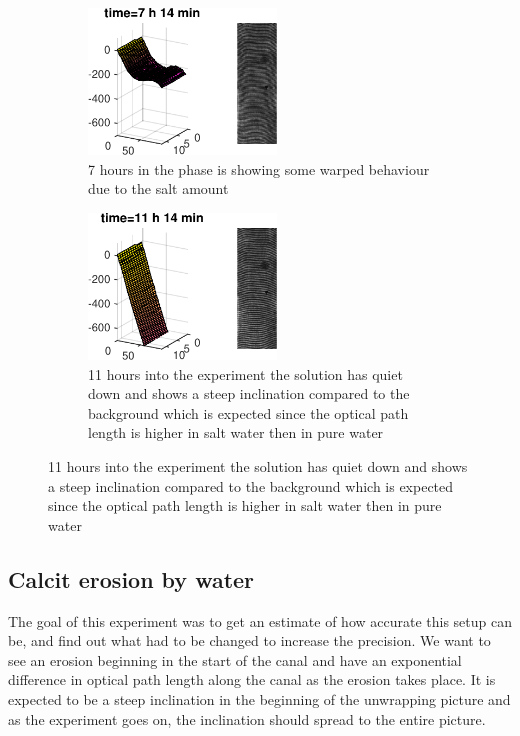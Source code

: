 \begin {figure}[ht!]
\begin {subfigure}[h]{0.35\textwidth}
\includegraphics [frame,width=5cm]{bilder/diff202.pdf}
\caption {7 hours in the phase is showing some warped behaviour due to the salt amount}
\label {diff3}
\end {subfigure}
\hfill
\begin {subfigure}[h]{0.35\textwidth}
\includegraphics [frame,width=5cm]{bilder/diff302.pdf}
\caption {11 hours into the experiment the solution has quiet down and shows a
steep inclination compared to the background which is expected since the optical
path length is higher in salt water then in pure water}
\label {diff4}
\end {subfigure}
\end {figure}

\subsection {Calcit erosion by water}

The goal of this experiment was to get an estimate of how accurate this setup can be,
and find out what had to be changed to increase the precision.
We want to see an erosion beginning in the start of the canal and have an exponential
difference in optical path length along the canal as the erosion takes place.
It is expected to be a steep inclination in the beginning of the unwrapping picture
and as the experiment goes on, the inclination should spread to the entire picture.

